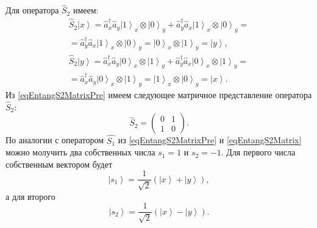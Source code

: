 Для оператора $\hat{S}_2$ имеем:
\begin{eqnarray}
\hat{S}_2 \left|x\right> = \hat{a}_x^{\dag} \hat{a}_y
\left|1\right>_x\otimes\left|0\right>_y + \hat{a}_y^{\dag}
\hat{a}_x\left|1\right>_x\otimes\left|0\right>_y =
\nonumber \\
= 
\hat{a}_y^{\dag}
\hat{a}_x\left|1\right>_x\otimes\left|0\right>_y =
\left|0\right>_x\otimes\left|1\right>_y = \left|y\right>,
\nonumber \\
\hat{S}_2 \left|y\right> = \hat{a}_x^{\dag} \hat{a}_y
\left|0\right>_x\otimes\left|1\right>_y + \hat{a}_y^{\dag}
\hat{a}_x\left|0\right>_x\otimes\left|1\right>_y =
\nonumber \\
=
\hat{a}_x^{\dag} \hat{a}_y
\left|0\right>_x\otimes\left|1\right>_y
=\left|1\right>_x\otimes\left|0\right>_y = \left|x\right>.
\label{eqEntangS2MatrixPre}
\end{eqnarray}
Из \eqref{eqEntangS2MatrixPre} имеем следующее матричное представление
оператора $\hat{S}_2$:
\begin{equation}
\hat{S}_2 = 
\left(
\begin{array}{cc}
0 & 1 \\
1 & 0 
\end{array}
\right).
\label{eqEntangS2Matrix}
\end{equation}
По аналогии с оператором $\hat{S_1}$ из \eqref{eqEntangS2MatrixPre} и
\eqref{eqEntangS2Matrix} можно молучить два собственных числа $s_1 =
1$ и $s_2 = -1$.
Для первого числа собственным вектором будет
\begin{equation}
\left|s_1\right> = \frac{1}{\sqrt{2}}\left(\left|x\right> +
\left|y\right>\right),
\label{eq:part2:pol:stocks_s2_1}
\end{equation}
а для второго
\begin{equation}
\left|s_2\right> = \frac{1}{\sqrt{2}}\left(\left|x\right> - \left|y\right>\right).
\label{eq:part2:pol:stocks_s2_2}
\end{equation}

